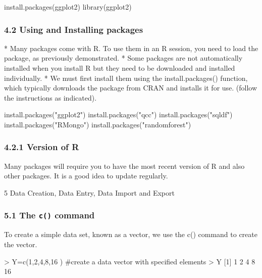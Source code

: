  \begin{framed}
 \begin{semiverbatim}
 install.packages(ggplot2)
 library(ggplot2)
 \end{semiverbatim}
 \end{framed}
 
 
 \frametitle{4.2 Using and Installing packages}
 
*  Many packages come with R. To use them in an R session, you need to load the package, as
 previously demonstrated.
*  Some packages are not automatically installed when you install R but they need to be downloaded
 and installed individually. 
*  We must first install them using the install.packages()
 function, which typically downloads the package from CRAN and installs it for use. (follow the
 instructions as indicated).

 
 
 \begin{framed}
 \begin{semiverbatim}
 install.packages("ggplot2")
 install.packages("qcc")
 install.packages("sqldf")
 install.packages("RMongo")
 install.packages("randomforest")
 \end{semiverbatim}
 \end{framed}
 
 
 
 \frametitle{4.2.1 Version of R}
 Many packages will require you to have the most recent version of R and also other packages.
 It is a good idea to update regularly.
 
 
 5 Data Creation, Data Entry, Data Import and Export
 
 
 \frametitle{5.1 The \texttt{c()} command}
 To create a simple data set, known as a vector, we use the c() command to create the vector.
 \begin{framed}
 \begin{semiverbatim}
 > Y=c(1,2,4,8,16 ) #create a data vector with specified elements
 > Y
 [1] 1 2 4 8 16
 
 \end{semiverbatim}
 \end{framed}
 
